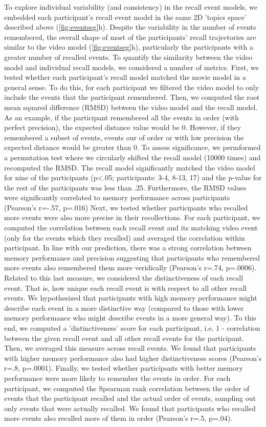 \documentclass[a4paper,man,natbib,floatsintext]{apa6}
\begin{document}
To explore individual variability (and consistency) in the recall event models, we embedded each participant's recall event model in the same 2D 'topics space' described above (\ref{fig:eventseg}h). Despite the variability in the number of events remembered, the overall shape of most of the participants' recall trajectories are similar to the video model (\ref{fig:eventseg}h), particularly the participants with a greater number of recalled events. To quantify the similarity between the video model and individual recall models, we considered a number of metrics.  First, we tested whether each participant's recall model matched the movie model in a general sense. To do this, for each participant we filtered the video model to only include the events that the participant remembered. Then, we computed the root mean squared difference (RMSD) between the video model and the recall model. As an example, if the participant remembered all the events in order (with perfect precision), the expected distance value would be 0. However, if they remembered a subset of events, events our of order or with low precision the expected distance would be greater than 0. To assess significance, we permformed a permutation test where we circularly shifted the recall model (10000 times) and recomputed the RMSD. The recall model significantly matched the video model for nine of the participants (p<.05; participants: 3-4, 8-13, 17) and the p-value for the rest of the participants was less than .25. Furthermore, the RMSD values were significantly correlated to memory performance across participants (Pearson's r=-.57, p=.016)  Next, we tested whether participants who recalled more events were also more precise in their recollections. For each participant, we computed the correlation between each recall event and its matching video event (only for the events which they recalled) and averaged the correlation within participant.  In line with our prediction, there was a strong correlation between memory performance and precision suggesting that participants who remembered more events also remembered them more veridically (Pearson's r=.74, p=.0006). Related to this last measure, we considered the distinctiveness of each recall event. That is, how unique each recall event is with respect to all other recall events. We hypothesized that participants with high memory performance might describe each event in a more distinctive way (compared to those with lower memory performance who might describe events in a more general way). To this end, we computed a 'distinctiveness' score for each participant, i.e. 1 - correlation between the given recall event and all other recall events for the participant.  Then, we averaged this measure across recall events.  We found that participants with higher memory performance also had higher distinctiveness scores (Pearson's r=.8, p=.0001). Finally, we tested whether participants with better memory performance were more likely to remember the events in order.  For each participant, we computed the Spearman rank correlation between the order of events that the participant recalled and the actual order of events, sampling out only events that were actually recalled.  We found that participants who recalled more events also recalled more of them in order (Pearson's r=.5, p=.04).
\end{document}
